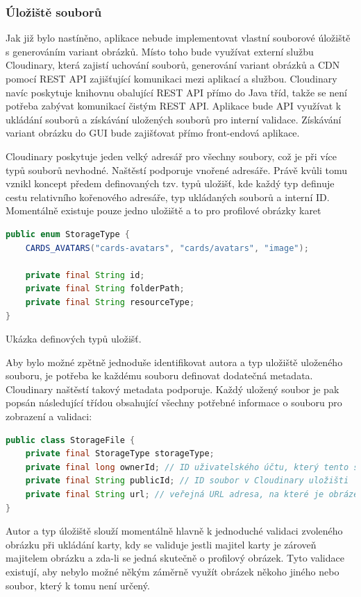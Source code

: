 \begin{itemize}
\begin{itemize}
		\subsubsection{Úložiště souborů}

		Jak již bylo nastíněno, aplikace nebude implementovat vlastní souborové úložiště s generováním variant obrázků.
		Místo toho bude využívat externí službu Cloudinary, která zajistí uchování souborů, generování variant obrázků
		a \ac{CDN} pomocí \ac{REST} \ac{API} zajišťující komunikaci mezi aplikací a službou.
		Cloudinary navíc poskytuje knihovnu obalující \ac{REST} \ac{API} přímo do Java tříd, takže se není potřeba zabývat
		komunikací čistým \ac{REST} \ac{API}.
		Aplikace bude \ac{API} využívat k ukládání souborů a získávání uložených souborů pro interní validace.
		Získávání variant obrázku do \ac{GUI} bude zajišťovat přímo front-endová aplikace.

		Cloudinary poskytuje jeden velký adresář pro všechny soubory, což je při více typů souborů nevhodné.
		Naštěstí podporuje vnořené adresáře.
		Právě kvůli tomu vznikl koncept předem definovaných tzv. typů uložišť, kde každý typ definuje cestu
		relativního kořenového adresáře, typ ukládaných souborů a interní ID.
		Momentálně existuje pouze jedno uložiště a to pro profilové obrázky karet

		\begin{lstlisting}[language=Java]
public enum StorageType {
    CARDS_AVATARS("cards-avatars", "cards/avatars", "image");

    private final String id;
    private final String folderPath;
    private final String resourceType;
}
		\end{lstlisting}
		Ukázka definových typů uložišť. %

		Aby bylo možné zpětně jednoduše identifikovat autora a typ uložiště uloženého souboru, je potřeba ke každému
		souboru definovat dodatečná metadata.
		Cloudinary naštěstí takový metadata podporuje.
		Každý uložený soubor je pak popsán následující třídou obsahující všechny potřebné informace o souboru pro zobrazení
		a validaci:
		\begin{lstlisting}[language=Java]
public class StorageFile {
    private final StorageType storageType;
    private final long ownerId; // ID uživatelského účtu, který tento soubor nahrál
    private final String publicId; // ID soubor v Cloudinary uložišti
    private final String url; // veřejná URL adresa, na které je obrázek možné zobrazit
}
		\end{lstlisting}
		Autor a typ úložiště slouží momentálně hlavně k jednoduché validaci zvoleného obrázku při ukládání karty, kdy
		se validuje jestli majitel karty je zároveň majitelem obrázku a zda-li se jedná skutečně o profilový obrázek.
		Tyto validace existují, aby nebylo možné někým záměrně využít obrázek někoho jiného nebo soubor, který k tomu
		není určený.


\end{itemize}
\end{itemize}
